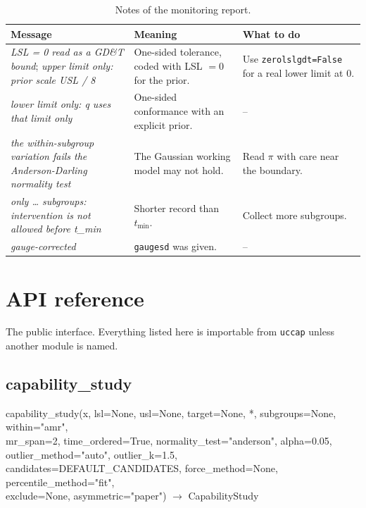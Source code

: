 \documentclass[a4paper,11pt,oneside,openany,parskip=half-,headings=standardclasses,toc=flat,numbers=noenddot]{scrbook}
\newcommand{\thead}[1]{{\sffamily\bfseries\footnotesize #1}}
\newcommand{\code}[1]{\texttt{\begingroup\def\_{\textunderscore\allowbreak}#1\endgroup}}
\newenvironment{chapterintro}{\begingroup\sffamily\small\color{muted}\noindent\ignorespaces}{\par\endgroup\medskip}
\newcommand{\msg}[1]{\textit{#1}}
\newcommand{\apihead}[1]{\par\medskip\noindent\begin{tcolorbox}[enhanced, colback=accentlight, colframe=accentlight, boxrule=0pt, arc=1.5pt, left=8pt, right=8pt, top=5pt, bottom=5pt, before skip=6pt, after skip=8pt, fontupper=\ttfamily\small]#1\end{tcolorbox}}
\begin{document}
\begin{table}[!htp]
\caption{Notes of the monitoring report.}
\small
\begin{tabularx}{\textwidth}{@{}P{54mm}LP{46mm}@{}}
\toprule
\thead{Message} & \thead{Meaning} & \thead{What to do}\\
\midrule
\msg{LSL = 0 read as a GD\&T bound}; \msg{upper limit only: prior scale USL / 8} & One-sided tolerance, coded with LSL $= 0$ for the prior. & Use \code{zero\_lsl\_gdt=False} for a real lower limit at 0.\\
\msg{lower limit only: q uses that limit only} & One-sided conformance with an explicit prior. & --\\
\msg{the within-subgroup variation fails the Anderson-Darling normality test} & The Gaussian working model may not hold. & Read $\pi$ with care near the boundary.\\
\msg{only \ldots{} subgroups: intervention is not allowed before t\_min} & Shorter record than $t_{\min}$. & Collect more subgroups.\\
\msg{gauge-corrected} & \code{gauge\_sd} was given. & --\\
\bottomrule
\end{tabularx}
\end{table}

\chapter{API reference}\label{ch:api}

\begin{chapterintro}
The public interface. Everything listed here is importable from \code{uccap} unless another module is named.
\end{chapterintro}

\section{capability\_study}

\apihead{capability\_study(x, lsl=None, usl=None, target=None, *, subgroups=None, within="amr",\\
\hspace*{2em}mr\_span=2, time\_ordered=True, normality\_test="anderson", alpha=0.05, outlier\_method="auto", outlier\_k=1.5,\\
\hspace*{2em}candidates=DEFAULT\_CANDIDATES, force\_method=None, percentile\_method="fit",\\
\hspace*{2em}exclude=None, asymmetric="paper") $\rightarrow$ CapabilityStudy}
\end{document}
